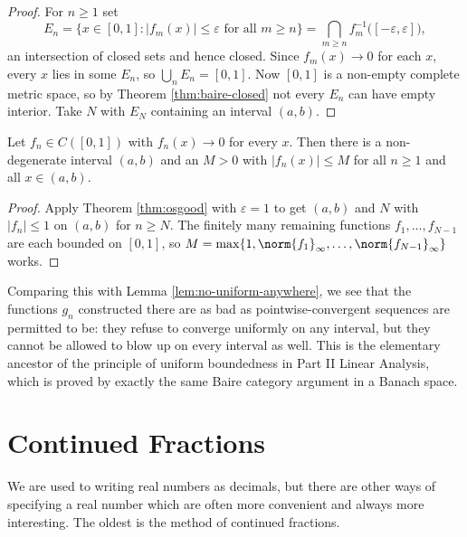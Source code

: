 \documentclass[a4paper]{scrartcl}
\begin{document}
\begin{proof}
	For $n\geq1$ set
	$$E_n = \{x\in[0,1] : |f_m(x)|\leq\varepsilon\text{ for all }m\geq n\} = \bigcap_{m\geq n}f_m^{-1}\big([-\varepsilon,\varepsilon]\big),$$
	an intersection of closed sets and hence closed. Since $f_m(x)\to0$ for each $x$, every $x$ lies in some $E_n$, so $\bigcup_nE_n=[0,1]$. Now $[0,1]$ is a non-empty complete metric space, so by Theorem \ref{thm:baire-closed} not every $E_n$ can have empty interior. Take $N$ with $E_N$ containing an interval $(a,b)$.
\end{proof}

\begin{corollary}\label{cor:uniform-bdd}
	Let $f_n\in C([0,1])$ with $f_n(x)\to0$ for every $x$. Then there is a non-degenerate interval $(a,b)$ and an $M>0$ with $|f_n(x)|\leq M$ for all $n\geq1$ and all $x\in(a,b)$.
\end{corollary}

\begin{proof}
	Apply Theorem \ref{thm:osgood} with $\varepsilon=1$ to get $(a,b)$ and $N$ with $|f_n|\leq1$ on $(a,b)$ for $n\geq N$. The finitely many remaining functions $f_1,\ldots,f_{N-1}$ are each bounded on $[0,1]$, so $M = \max\{1,\norm{f_1}_\infty,\ldots,\norm{f_{N-1}}_\infty\}$ works.
\end{proof}

Comparing this with Lemma \ref{lem:no-uniform-anywhere}, we see that the functions $g_n$ constructed there are as bad as pointwise-convergent sequences are permitted to be: they refuse to converge uniformly on any interval, but they cannot be allowed to blow up on every interval as well. This is the elementary ancestor of the principle of uniform boundedness in Part II Linear Analysis, which is proved by exactly the same Baire category argument in a Banach space.

\section{Continued Fractions}

We are used to writing real numbers as decimals, but there are other ways of specifying a real number which are often more convenient and always more interesting. The oldest is the method of continued fractions.
\end{document}
